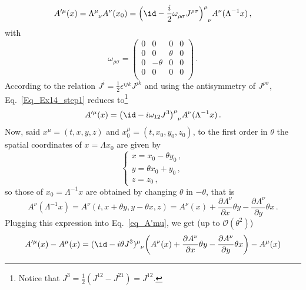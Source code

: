 \begin{sol}
    \begin{equation}
        A'^{\mu}(x) = \tensor{\Lambda}{^\mu_\nu} A^{\nu}(x_{0}) = \Bigl(\id - \frac{i}{2}\tensor{\omega}{_\rho_\sigma}J^{\rho \sigma}\tensor{\Bigr)}{^\mu_\nu} A^{\nu}(\Lambda^{-1} x) \,,
        \label{Eq_Ex14_step1}
    \end{equation}
    with
    \begin{equation}
        \omega_{\rho \sigma} = \begin{pmatrix}
            0 & 0 & 0 & 0 \\
            0 & 0 & \theta & 0 \\
            0 & -\theta & 0 & 0 \\
            0 & 0 & 0 & 0 \\
        \end{pmatrix}\,.
    \end{equation}
    According to the relation $J^i = \frac{1}{2} \epsilon^{ijk} J^{jk}$ and using the antisymmetry of $J^{\rho \sigma}$, Eq.~\eqref{Eq_Ex14_step1} reduces to\footnote{Notice that $J^{3} = \frac{1}{2}(J^{12}-J^{21}) = J^{12}$.} 
    \begin{equation}
    \label{eq_A'mu}
        A'^{\mu}(x) = \bigl(\id - i \omega_{12}J^{3}\tensor{\bigr)}{^\mu _\nu} A^{\nu}(\Lambda^{-1} x)\,.
    \end{equation}
    Now, said $x^\mu = (t,x,y,z)$ and $x_0^\mu = (t,x_0,y_0,z_0)$, to the first order in $\theta$ the spatial coordinates of $x = \Lambda x_0$ are given by
    \begin{equation}
        \begin{cases}
            x = x_0 - \theta y_0 \, , \\
            y = \theta x_0 + y_0 \, , \\
            z = z_0 \, ,
        \end{cases}
    \end{equation}
    so those of $x_0 = \Lambda^{-1} x$ are obtained by changing $\theta$ in $-\theta$, that is
    \begin{equation}
        A^{\nu}(\Lambda^{-1} x) = A^{\nu}(t, x+\theta y, y-\theta x, z) = A^{\nu}(x) + \frac{\partial A^{\nu}}{\partial x}\theta y - \frac{\partial A^{\nu}}{\partial y}\theta x \,.
    \end{equation}
    Plugging this expression into Eq.~\eqref{eq_A'mu}, we get (up to $\mathcal{O}(\theta^{2})$)
    \begin{align}
            A'^{\mu}(x) - A^{\mu}(x) &= (\id - i\theta J^{3}\tensor{)}{^\mu _\nu}\biggl(A^{\nu}(x) + \frac{\partial A^{\nu}}{\partial x}\theta y - \frac{\partial A^{\nu}}{\partial y}\theta x\biggr) - A^{\mu}(x) \notag\\

\end{align}
\end{sol}
